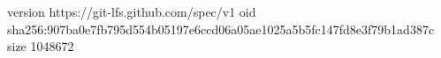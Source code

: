 version https://git-lfs.github.com/spec/v1
oid sha256:907ba0e7fb795d554b05197e6ccd06a05ae1025a5b5fc147fd8e3f79b1ad387c
size 1048672
